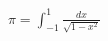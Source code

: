 \documentclass{standalone}
\begin{document}
$\pi = \int_{-1}^1 \frac{dx}{\sqrt{1 - x^2}}$
\end{document}
